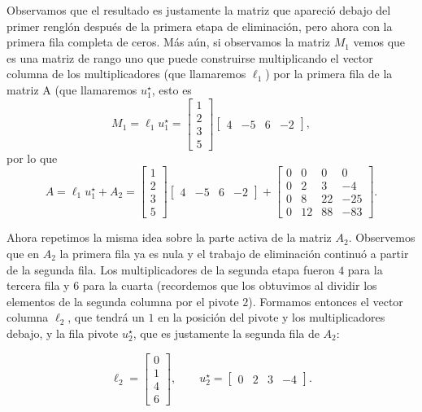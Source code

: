 Observamos que el resultado es justamente la matriz que apareció debajo del primer renglón después de la primera etapa de eliminación, pero ahora con la primera fila completa de ceros. Más aún, si observamos la matriz $M_1$ vemos que es una matriz de rango uno que puede construirse multiplicando el vector columna de los multiplicadores (que llamaremos $\ell_1$) por la primera fila de la matriz A (que llamaremos $u_1^\star$, esto es
\[M_1 = \ell_1 u_1^\star = \begin{bmatrix}
    1 \\ 2 \\ 3 \\ 5
\end{bmatrix} \begin{bmatrix}
    4 & -5 & 6 & -2
\end{bmatrix},\]
por lo que 
\[A =  \ell_1 u_1^\star + A_2 = \begin{bmatrix}
    1 \\ 2 \\ 3 \\ 5
\end{bmatrix} \begin{bmatrix}
    4 & -5 & 6 & -2
\end{bmatrix} + \begin{bmatrix}
0 & 0 &  0 &  0 \\
0 & 2 &  3 & -4 \\
0 & 8 & 22 & -25 \\
0 & 12 & 88 & -83
\end{bmatrix}.\]

Ahora repetimos la misma idea sobre la parte activa de la matriz $A_2$. Observemos que en $A_2$ la primera fila ya es nula y el trabajo de eliminación continuó a partir de la segunda fila. Los multiplicadores de la segunda etapa fueron $4$ para la tercera fila y $6$ para la cuarta (recordemos que los obtuvimos al dividir los elementos de la segunda columna por el pivote $2$). Formamos entonces el vector columna $\ell_2$, que tendrá un $1$ en la posición del pivote y los multiplicadores debajo, y la fila pivote $u_2^\star$, que es justamente la segunda fila de $A_2$:

\[
\ell_2 = \begin{bmatrix} 0 \\ 1 \\ 4 \\ 6 \end{bmatrix}, \qquad
u_2^\star = \begin{bmatrix} 0 & 2 & 3 & -4 \end{bmatrix}.
\]

